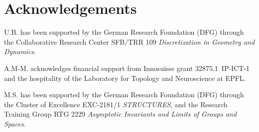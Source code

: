 
\section*{Acknowledgements}

U.B. has been supported by the German Research Foundation (DFG) through the Collaborative Research Center SFB/TRR 109 \emph{Discretization in Geometry and Dynamics}.

A.M-M. acknowledges financial support from Innosuisse grant \mbox{32875.1 IP-ICT-1} and the hospitality of the Laboratory for Topology and Neuroscience at EPFL.

M.S. has been supported by the German Research Foundation (DFG) through	the Cluster of Excellence EXC-2181/1 \emph{STRUCTURES}, and the Research Training Group RTG 2229 \emph{Asymptotic Invariants and Limits of Groups and Spaces}.
